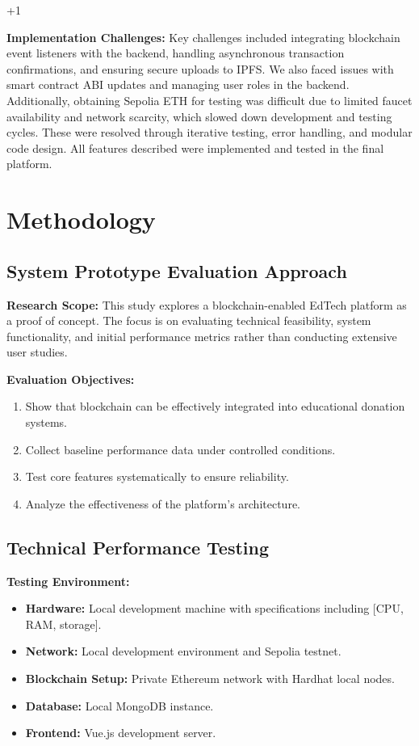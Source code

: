 +1\documentclass[conference]{IEEEtran}
\begin{document}
\textbf{Implementation Challenges:}
Key challenges included integrating blockchain event listeners with the backend, handling asynchronous transaction confirmations, and ensuring secure uploads to IPFS. We also faced issues with smart contract ABI updates and managing user roles in the backend. Additionally, obtaining Sepolia ETH for testing was difficult due to limited faucet availability and network scarcity, which slowed down development and testing cycles. These were resolved through iterative testing, error handling, and modular code design. All features described were implemented and tested in the final platform.

\section{Methodology}
\subsection{System Prototype Evaluation Approach}
\textbf{Research Scope:} This study explores a blockchain-enabled EdTech platform as a proof of concept. The focus is on evaluating technical feasibility, system functionality, and initial performance metrics rather than conducting extensive user studies.

\textbf{Evaluation Objectives:}
\begin{enumerate}
    \item Show that blockchain can be effectively integrated into educational donation systems.
    \item Collect baseline performance data under controlled conditions.
    \item Test core features systematically to ensure reliability.
    \item Analyze the effectiveness of the platform’s architecture.
\end{enumerate}

\subsection{Technical Performance Testing}
\textbf{Testing Environment:}
\begin{itemize}
    \item \textbf{Hardware:} Local development machine with specifications including [CPU, RAM, storage].
    \item \textbf{Network:} Local development environment and Sepolia testnet.
    \item \textbf{Blockchain Setup:} Private Ethereum network with Hardhat local nodes.
    \item \textbf{Database:} Local MongoDB instance.
    \item \textbf{Frontend:} Vue.js development server.
\end{itemize}
\end{document}
